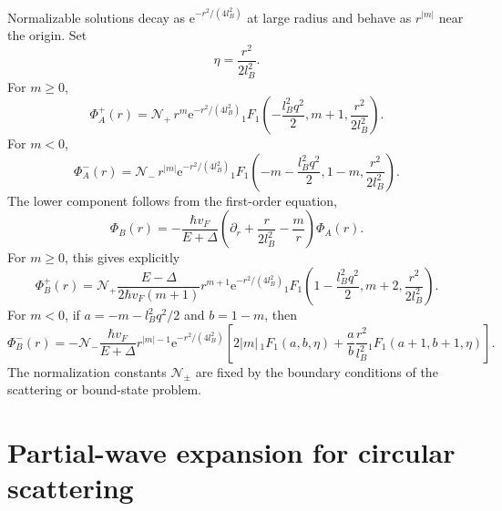 \documentclass[11pt]{article}
\newcommand{\ee}{\mathrm e}
\begin{document}
Normalizable solutions decay as \(\ee^{-r^2/(4l_B^2)}\) at large radius and behave as \(r^{|m|}\) near the origin. Set
\begin{equation}
  \eta=\frac{r^2}{2l_B^2}.
\end{equation}
For \(m\ge0\),
\begin{equation}
  \Phi_A^+(r)=\mathcal N_+\,r^m\ee^{-r^2/(4l_B^2)}
  {}_1F_1\left(-\frac{l_B^2q^2}{2},m+1,\frac{r^2}{2l_B^2}\right).
\end{equation}
For \(m<0\),
\begin{equation}
  \Phi_A^-(r)=\mathcal N_-\,r^{|m|}\ee^{-r^2/(4l_B^2)}
  {}_1F_1\left(-m-\frac{l_B^2q^2}{2},1-m,\frac{r^2}{2l_B^2}\right).
\end{equation}
The lower component follows from the first-order equation,
\begin{equation}
  \Phi_B(r)=-\frac{\hbar v_F}{E+\Delta}
  \left(\partial_r+\frac{r}{2l_B^2}-\frac{m}{r}\right)\Phi_A(r).
\end{equation}
For \(m\ge0\), this gives explicitly
\begin{equation}
  \Phi_B^+(r)=\mathcal N_+\frac{E-\Delta}{2\hbar v_F(m+1)}
  r^{m+1}\ee^{-r^2/(4l_B^2)}
  {}_1F_1\left(1-\frac{l_B^2q^2}{2},m+2,\frac{r^2}{2l_B^2}\right).
\end{equation}
For \(m<0\), if \(a=-m-l_B^2q^2/2\) and \(b=1-m\), then
\begin{equation}
  \Phi_B^-(r)=-\mathcal N_-\frac{\hbar v_F}{E+\Delta}
  r^{|m|-1}\ee^{-r^2/(4l_B^2)}
  \left[2|m|\,{}_1F_1(a,b,\eta)+\frac{a}{b}\frac{r^2}{l_B^2}{}_1F_1(a+1,b+1,\eta)\right].
\end{equation}
The normalization constants \(\mathcal N_\pm\) are fixed by the boundary conditions of the scattering or bound-state problem.

\section{Partial-wave expansion for circular scattering}
\end{document}
